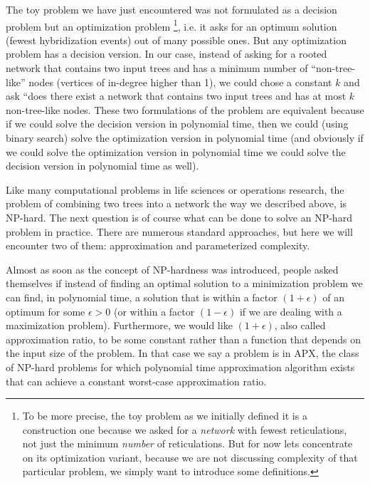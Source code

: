 {
The toy problem we have just encountered was not formulated as a decision problem but an optimization problem \footnote{To be more precise, the toy problem as we initially defined it is a construction one because we asked for a \textit{network} with fewest reticulations, not just the minimum \textit{number} of reticulations. But for now lets concentrate on its optimization variant, because we are not discussing complexity of that particular problem, we simply want to introduce some definitions.}, i.e. it asks for an optimum solution (fewest hybridization events) out of many possible ones. But any optimization problem has a decision version. In our case, instead of asking for a rooted network that contains two input trees and has a minimum number of ``non-tree-like'' nodes (vertices of in-degree higher than 1), we could chose a constant $k$ and ask ``does there exist a network that contains two input trees and has at most $k$ non-tree-like nodes. These two formulations of the problem are equivalent because if we could solve the decision version in polynomial time, then we could (using binary search) solve the optimization version in polynomial time (and obviously if we could solve the optimization version in polynomial time we could solve the decision version in polynomial time as well).  


Like many computational problems in life sciences or operations research, the problem of combining two trees into a network the way we described above, is NP-hard. The next question is of course what can be done to solve an NP-hard problem in practice. There are numerous standard approaches, but here we will encounter two of them: approximation and parameterized complexity. 



Almost as soon as the concept of NP-hardness was introduced, people asked themselves if instead of finding an optimal solution to a minimization problem we can find, in polynomial time, a solution that is within a factor $(1+ \epsilon)$ of an optimum for some $\epsilon >0$ (or within a factor $(1 - \epsilon)$ if we are dealing with a maximization problem). Furthermore, we would like $(1+\epsilon)$, also called approximation ratio, to be some constant rather than a function that depends on the input size of the problem. In that case we say a problem is in APX, the class of NP-hard problems for which polynomial time approximation algorithm exists that can achieve a constant worst-case approximation ratio. 

}
